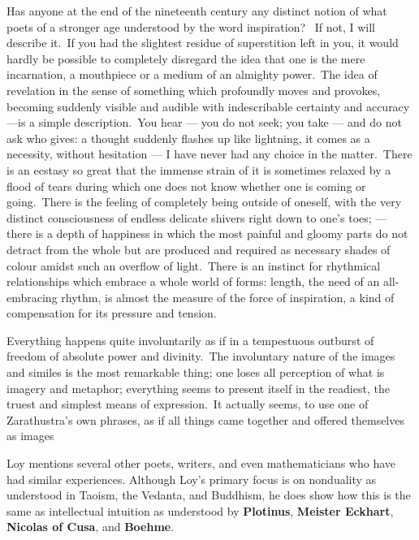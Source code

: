 \begin{quotex}
Has anyone at the end of the nineteenth century any distinct notion of what poets of a stronger age understood by the word inspiration?  If not, I will describe it. If you had the slightest residue of superstition left in you, it would hardly be possible to completely disregard the idea that one is the mere incarnation, a mouthpiece or a medium of an almighty power. The idea of revelation in the sense of something which profoundly moves and provokes, becoming suddenly visible and audible with indescribable certainty and accuracy—is a simple description. You hear — you do not seek; you take — and do not ask who gives: a thought suddenly flashes up like lightning, it comes as a necessity, without hesitation — I have never had any choice in the matter. There is an ecstasy so great that the immense strain of it is sometimes relaxed by a flood of tears during which one does not know whether one is coming or going. There is the feeling of completely being outside of oneself, with the very distinct consciousness of endless delicate shivers right down to one's toes; — there is a depth of happiness in which the most painful and gloomy parts do not detract from the whole but are produced and required as necessary shades of colour amidst such an overflow of light. There is an instinct for rhythmical relationships which embrace a whole world of forms: length, the need of an all-embracing rhythm, is almost the measure of the force of inspiration, a kind of compensation for its pressure and tension.



Everything happens quite involuntarily as if in a tempestuous outburst of freedom of absolute power and divinity. The involuntary nature of the images and similes is the most remarkable thing; one loses all perception of what is imagery and metaphor; everything seems to present itself in the readiest, the truest and simplest means of expression. It actually seems, to use one of Zarathustra's own phrases, as if all things came together and offered themselves as images 

\end{quotex}
Loy mentions several other poets, writers, and even mathematicians who have had similar experiences. Although Loy's primary focus is on nonduality as understood in Taoism, the Vedanta, and Buddhism, he does show how this is the same as intellectual intuition as understood by \textbf{Plotinus}, \textbf{Meister Eckhart}, \textbf{Nicolas of Cusa}, and \textbf{Boehme}.

